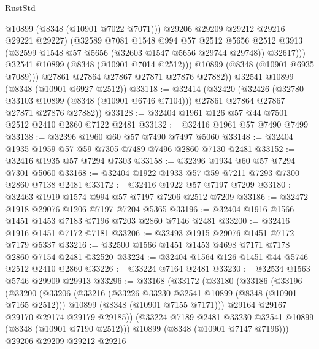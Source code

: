 \begin{lexlean}{RustStd}
\begin{coremodule}
                    @10899
                    (@8348 (@10901 @7022 @7071)))
                  @29206
                  @29209
                  @29212
                  @29216
                  @29221
                  @29227)
                (@32589
                  @7081
                  @1548
                  @994
                  @57
                  @2512
                  @5656
                  @2512
                  @3913
                  (@32599 @1548 @57 @5656 (@32603 @1547 @5656 @29744 @29748))
                  @32617)))
            @32541
            @10899
            (@8348 (@10901 @7014 @2512)))
          @10899
          (@8348 (@10901 @6935 @7089)))
        @27861
        @27864
        @27867
        @27871
        @27876
        @27882))
    @32541
    @10899
    (@8348 (@10901 @6927 @2512))
@33118 := @32414
    (@32420
      (@32426
        (@32780 @33103 @10899 (@8348 (@10901 @6746 @7104)))
        @27861
        @27864
        @27867
        @27871
        @27876
        @27882))
@33128 := @32404 @1961 @126 @57 @44 @7501 @2512 @2410 @2860 @7122 @2481
@33132 := @32416 @1961 @57 @7490 @7499
@33138 := @32396 @1960 @60 @57 @7490 @7497 @5060
@33148 := @32404 @1935 @1959 @57 @59 @7305 @7489 @7496 @2860 @7130 @2481
@33152 := @32416 @1935 @57 @7294 @7303
@33158 := @32396 @1934 @60 @57 @7294 @7301 @5060
@33168 := @32404 @1922 @1933 @57 @59 @7211 @7293 @7300 @2860 @7138 @2481
@33172 := @32416 @1922 @57 @7197 @7209
@33180 := @32463 @1919 @1574 @994 @57 @7197 @7206 @2512 @7209
@33186 := @32472 @1918 @29076 @1206 @7197 @7204 @5365
@33196 := @32404 @1916 @1566 @1451 @1453 @7183 @7196 @7203 @2860 @7146 @2481
@33200 := @32416 @1916 @1451 @7172 @7181
@33206 := @32493 @1915 @29076 @1451 @7172 @7179 @5337
@33216 := @32500 @1566 @1451 @1453 @4698 @7171 @7178 @2860 @7154 @2481 @32520
@33224 := @32404 @1564 @126 @1451 @44 @5746 @2512 @2410 @2860
@33226 := @33224 @7164 @2481
@33230 := @32534 @1563 @5746 @29909 @29913
@33296 := @33168
    (@33172
      (@33180
        (@33186
          (@33196
            (@33200
              (@33206
                (@33216
                  (@33226 @33230 @32541 @10899 (@8348 (@10901 @7165 @2512)))
                  @10899
                  (@8348 (@10901 @7155 @7171)))
                @29164
                @29167
                @29170
                @29174
                @29179
                @29185))
            (@33224 @7189 @2481 @33230 @32541 @10899 (@8348 (@10901 @7190 @2512)))
            @10899
            (@8348 (@10901 @7147 @7196)))
          @29206
          @29209
          @29212
          @29216

\end{coremodule}
\end{lexlean}
